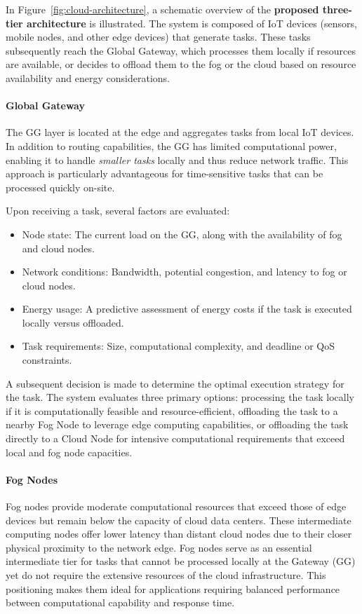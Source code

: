 \documentclass[preprint,12pt]{elsarticle}
\begin{document}
In Figure~\ref{fig:cloud-architecture}, a schematic overview of the \textbf{proposed three-tier architecture} is illustrated. The system is composed of IoT devices (sensors, mobile nodes, and other edge devices) that generate tasks. These tasks subsequently reach the Global Gateway, which processes them locally if resources are available, or decides to offload them to the fog or the cloud based on resource availability and energy considerations.



\paragraph{Global Gateway}
\label{subsubsec:GG}

The GG layer is located at the edge and aggregates tasks from local IoT devices. In addition to routing capabilities, the GG has limited computational power, enabling it to handle \emph{smaller tasks} locally and thus reduce network traffic. This approach is particularly advantageous for time-sensitive tasks that can be processed quickly on-site.

Upon receiving a task, several factors are evaluated:
\begin{itemize}
    \item Node state: The current load on the GG, along with the availability of fog and cloud nodes.
    \item Network conditions: Bandwidth, potential congestion, and latency to fog or cloud nodes.
    \item Energy usage: A predictive assessment of energy costs if the task is executed locally versus offloaded.
    \item Task requirements: Size, computational complexity, and deadline or QoS constraints.
\end{itemize}

A subsequent decision is made to determine the optimal execution strategy for the task. The system evaluates three primary options: processing the task locally if it is computationally feasible and resource-efficient, offloading the task to a nearby Fog Node to leverage edge computing capabilities, or offloading the task directly to a Cloud Node for intensive computational requirements that exceed local and fog node capacities.


\paragraph{Fog Nodes}
\label{subsubsec:Fog}
Fog nodes provide moderate computational resources that exceed those of edge devices but remain below the capacity of cloud data centers. These intermediate computing nodes offer lower latency than distant cloud nodes due to their closer physical proximity to the network edge. Fog nodes serve as an essential intermediate tier for tasks that cannot be processed locally at the Gateway (GG) yet do not require the extensive resources of the cloud infrastructure. This positioning makes them ideal for applications requiring balanced performance between computational capability and response time.
\end{document}
